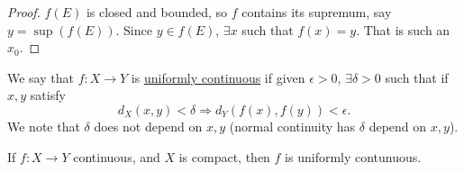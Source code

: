 \begin{proof}
    $f(E)$ is closed and bounded, so $f$ contains its supremum, say $y = \sup(f(E))$. Since $y\in f(E)$, $\exists x$ such that $f(x) = y$. That is such an $x_0$.
\end{proof}

\begin{definition}
    We say that $f : X\to Y$ is \ul{uniformly continuous} if given $\epsilon > 0$, $\exists \delta > 0$ such that if $x, y$ satisfy
    \[d_X(x, y) < \delta \Rightarrow d_Y(f(x), f(y)) < \epsilon.\]
    We note that $\delta$ does not depend on $x, y$ (normal continuity has $\delta$ depend on $x, y$).
\end{definition}

\begin{theorem}
    If $f : X\to Y$ continuous, and $X$ is compact, then $f$ is uniformly contunuous.
\end{theorem}
